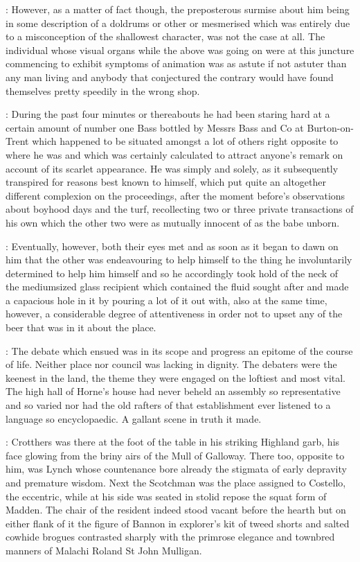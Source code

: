 :
However,
as a matter of fact though,
the preposterous surmise about him
being in some description of a doldrums or other or mesmerised which was
entirely due to a misconception of the shallowest character,
was not the
case at all.
The individual whose visual organs while the above was going
on were at this juncture commencing to exhibit symptoms of animation was
as astute if not astuter than any man living and anybody that conjectured the contrary
would have found themselves pretty speedily in the wrong shop.

:
During the past four minutes or thereabouts he had been staring
hard at a certain amount of number one Bass bottled by Messrs Bass and Co
at Burton-on-Trent which happened to be situated amongst a lot of others
right opposite to where he was and which was certainly calculated to
attract anyone's remark on account of its scarlet appearance.
He was
simply and solely,
as it subsequently transpired for reasons best known
to himself,
which put quite an altogether different complexion on the
proceedings,
after the moment before's observations about boyhood days
and the turf,
recollecting two or three private transactions of his own
which the other two were as mutually innocent of
as the babe unborn.

:
Eventually,
however,
both their eyes met and as soon as it began to dawn
on him that the other was endeavouring to help himself to the thing he
involuntarily determined to help him himself and so he accordingly took
hold of the neck of the mediumsized glass recipient which contained the
fluid sought after and made a capacious hole in it by pouring a lot of it
out with,
also at the same time,
however,
a considerable degree of
attentiveness in order not to upset any of the beer that was in it about
the place.


:
The debate which ensued was in its scope and progress an epitome of the
course of life.
Neither place nor council was lacking in dignity.
The debaters were the keenest in the land,
the theme they were engaged on the
loftiest and most vital.
The high hall of Horne's house had never beheld
an assembly so representative and so varied nor had the old rafters of
that establishment ever listened to a language so encyclopaedic.
A
gallant scene in truth it made.

:
Crotthers was there at the foot of the
table in his striking Highland garb,
his face glowing from the briny airs
of the Mull of Galloway.
There too,
opposite to him,
was Lynch whose
countenance bore already the stigmata of early depravity and premature
wisdom.
Next the Scotchman was the place assigned to Costello,
the
eccentric,
while at his side was seated in stolid repose the squat form
of Madden.
The chair of the resident indeed stood vacant before the hearth
but on either flank of it the figure of Bannon in explorer's kit
of tweed shorts and salted cowhide brogues contrasted sharply with the
primrose elegance and townbred manners of Malachi Roland St John
Mulligan.

